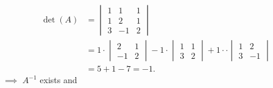 \documentclass[
  english,
  12pt,
  oneside]{book}
\theoremstyle{definition}
\theoremstyle{definition}
\theoremstyle{definition}
\theoremstyle{definition}
\theoremstyle{remark}
\begin{document}
\begin{align*}
\det(A) &= \begin{vmatrix}1&1&1\\1&2&1\\3&-1&2\end{vmatrix}\\
&= 1\cdot\begin{vmatrix}2&1\\-1&2\end{vmatrix} -1\cdot\begin{vmatrix}1&1\\3&2\end{vmatrix} +1\cdot\cdot\begin{vmatrix}1&2\\3&-1\end{vmatrix}\\
&= 5+1-7=-1.
\end{align*}
\(\implies\) \(A^{-1}\) exists and
\end{document}

